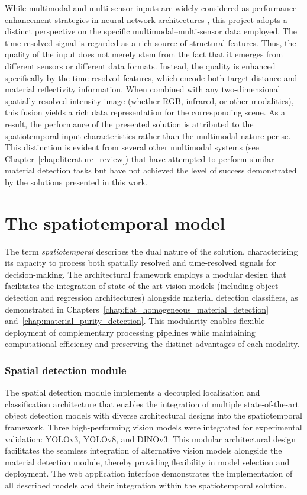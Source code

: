 \documentclass[12pt,a4paper,oneside]{report}
\let\oldsection\section
\renewcommand{\section}{\clearpage\oldsection}
\begin{document}
While multimodal and multi-sensor inputs are widely considered as performance enhancement strategies in neural network architectures \cite{gadzicki2020}, this project adopts a distinct perspective on the specific multimodal--multi-sensor data employed. The time-resolved signal is regarded as a rich source of structural features. Thus, the quality of the input does not merely stem from the fact that it emerges from different sensors or different data formats. Instead, the quality is enhanced specifically by the time-resolved features, which encode both target distance and material reflectivity information. When combined with any two-dimensional spatially resolved intensity image (whether RGB, infrared, or other modalities), this fusion yields a rich data representation for the corresponding scene. As a result, the performance of the presented solution is attributed to the spatiotemporal input characteristics rather than the multimodal nature per se. This distinction is evident from several other multimodal systems (see Chapter~\ref{chap:literature_review}) that have attempted to perform similar material detection tasks but have not achieved the level of success demonstrated by the solutions presented in this work.

\newpage
\section{The spatiotemporal model}
\label{subsec:signal_classifier}

The term \emph{spatiotemporal} describes the dual nature of the solution, characterising its capacity to process both spatially resolved and time-resolved signals for decision-making. The architectural framework employs a modular design that facilitates the integration of state-of-the-art vision models (including object detection and regression architectures) alongside material detection classifiers, as demonstrated in Chapters~\ref{chap:flat_homogeneous_material_detection} and~\ref{chap:material_purity_detection}. This modularity enables flexible deployment of complementary processing pipelines while maintaining computational efficiency and preserving the distinct advantages of each modality.

\subsubsection{Spatial detection module}
\label{subsec:spatial_detection_module}

The spatial detection module implements a decoupled localisation and classification architecture that enables the integration of multiple state-of-the-art object detection models with diverse architectural designs into the spatiotemporal framework. Three high-performing vision models were integrated for experimental validation: YOLOv3, YOLOv8, and DINOv3. This modular architectural design facilitates the seamless integration of alternative vision models alongside the material detection module, thereby providing flexibility in model selection and deployment. The web application interface demonstrates the implementation of all described models and their integration within the spatiotemporal solution.
\end{document}
